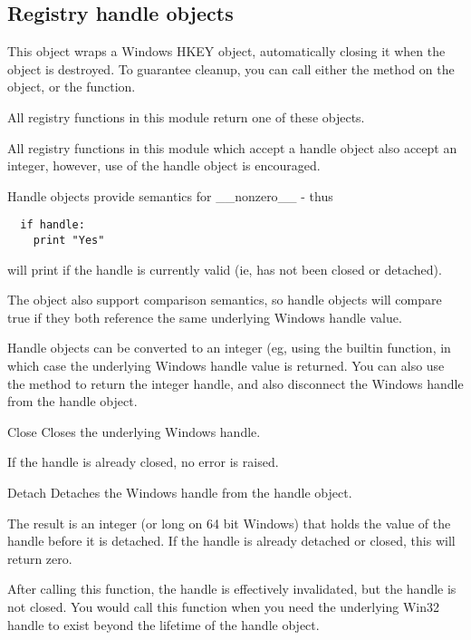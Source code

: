 \subsection{Registry handle objects \label{handle-object}}

 This object wraps a Windows HKEY object, automatically closing it when
 the object is destroyed.  To guarantee cleanup, you can call either
 the  method on the object, or the 
  function.
 
 All registry functions in this module return one of these objects.

 All registry functions in this module which accept a handle object 
 also accept an integer, however, use of the handle object is 
 encouraged.
 
 Handle objects provide semantics for __nonzero__ - thus
 \begin{verbatim}
  if handle:
    print "Yes"
 \end{verbatim}
 will print  if the handle is currently valid (ie,
 has not been closed or detached).
 
 The object also support comparison semantics, so handle
 objects will compare true if they both reference the same
 underlying Windows handle value.

 Handle objects can be converted to an integer (eg, using the
 builtin  function, in which case the underlying
 Windows handle value is returned.  You can also use the 
  method to return the integer handle, and
 also disconnect the Windows handle from the handle object.

\begin{methoddesc}{Close}
  Closes the underlying Windows handle.

  If the handle is already closed, no error is raised.
\end{methoddesc}


\begin{methoddesc}{Detach}
  Detaches the Windows handle from the handle object.

 The result is an integer (or long on 64 bit Windows) that holds
 the value of the handle before it is detached.  If the
 handle is already detached or closed, this will return zero.

 After calling this function, the handle is effectively invalidated,
 but the handle is not closed.  You would call this function when 
 you need the underlying Win32 handle to exist beyond the lifetime 
 of the handle object.
\end{methoddesc}
